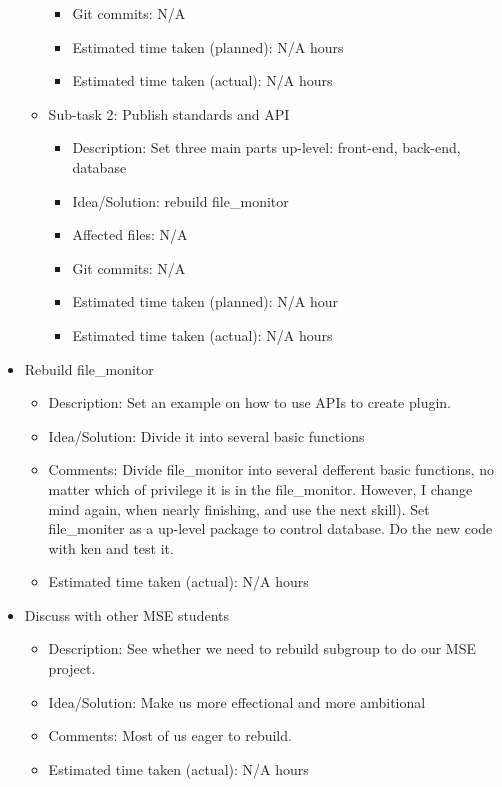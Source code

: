 \begin{itemize}
\begin{itemize}
\begin{itemize}
					\item Git commits: N/A
					\item Estimated time taken (planned): N/A hours
					\item Estimated time taken (actual): N/A hours
				 \end{itemize}
	         \item Sub-task 2: Publish standards and API
	            \begin{itemize}
				    \item Description: Set three main parts up-level: front-end, back-end, database
					\item Idea/Solution: rebuild file\_monitor 
					\item Affected files: N/A
					\item Git commits: N/A
					\item Estimated time taken (planned): N/A hour
					\item Estimated time taken (actual): N/A hours
				 \end{itemize}
	     \end{itemize}
	\item Rebuild file\_monitor
	     \begin{itemize}
	         \item Description: Set an example on how to use APIs to create plugin. 
	         \item Idea/Solution: Divide it into several basic functions
	         \item Comments: Divide file\_monitor into several defferent basic functions, no matter which of privilege it is in the file\_monitor. However, I change mind again, when nearly finishing, and use the next skill). Set file\_moniter as a up-level package to control database. Do the new code with ken and test it.
	         \item Estimated time taken (actual): N/A hours
	     \end{itemize}
	\item Discuss with other MSE students
	     \begin{itemize}
	         \item Description: See whether we need to rebuild subgroup to do our MSE project. 
	         \item Idea/Solution: Make us more effectional and more ambitional
	         \item Comments: Most of us eager to rebuild.
	         \item Estimated time taken (actual): N/A hours
	     \end{itemize}

\end{itemize}
